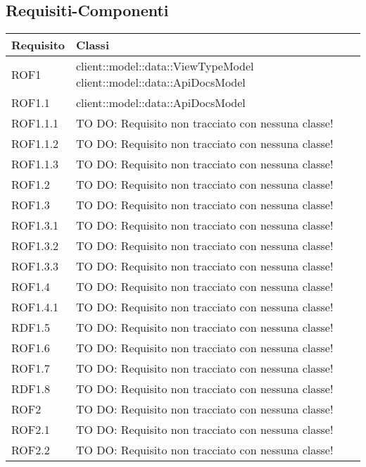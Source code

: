 \subsection{Requisiti-Componenti} %
\label{sub:componenti_requisiti}
\begin{center}
\def\arraystretch{1.5}
\bgroup
\begin{longtable}{| p{2.5cm} | p{11cm} |}
\hline
\textbf{Requisito} & \textbf{Classi} \\
\hline
ROF1 & client::model::data::ViewTypeModel \newline client::model::data::ApiDocsModel \\
\hline
ROF1.1 & client::model::data::ApiDocsModel \\
\hline
ROF1.1.1 & TO DO: Requisito non tracciato con nessuna classe! \\
\hline
ROF1.1.2 & TO DO: Requisito non tracciato con nessuna classe! \\
\hline
ROF1.1.3 & TO DO: Requisito non tracciato con nessuna classe! \\
\hline
ROF1.2 & TO DO: Requisito non tracciato con nessuna classe! \\
\hline
ROF1.3 & TO DO: Requisito non tracciato con nessuna classe! \\
\hline
ROF1.3.1 & TO DO: Requisito non tracciato con nessuna classe! \\
\hline
ROF1.3.2 & TO DO: Requisito non tracciato con nessuna classe! \\
\hline
ROF1.3.3 & TO DO: Requisito non tracciato con nessuna classe! \\
\hline
ROF1.4 & TO DO: Requisito non tracciato con nessuna classe! \\
\hline
ROF1.4.1 & TO DO: Requisito non tracciato con nessuna classe! \\
\hline
RDF1.5 & TO DO: Requisito non tracciato con nessuna classe! \\
\hline
ROF1.6 & TO DO: Requisito non tracciato con nessuna classe! \\
\hline
ROF1.7 & TO DO: Requisito non tracciato con nessuna classe! \\
\hline
RDF1.8 & TO DO: Requisito non tracciato con nessuna classe! \\
\hline
ROF2 & TO DO: Requisito non tracciato con nessuna classe! \\
\hline
ROF2.1 & TO DO: Requisito non tracciato con nessuna classe! \\
\hline
ROF2.2 & TO DO: Requisito non tracciato con nessuna classe! \\

\end{longtable}
\end{center}

